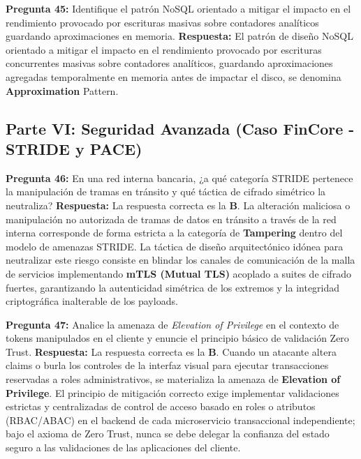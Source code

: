 \vspace{4mm}

\noindent\textbf{Pregunta 45:} Identifique el patrón NoSQL orientado a mitigar el impacto en el rendimiento provocado por escrituras masivas sobre contadores analíticos guardando aproximaciones en memoria.
\newline
\textbf{Respuesta:} El patrón de diseño NoSQL orientado a mitigar el impacto en el rendimiento provocado por escrituras concurrentes masivas sobre contadores analíticos, guardando aproximaciones agregadas temporalmente en memoria antes de impactar el disco, se denomina \textbf{Approximation} Pattern.

\subsection*{Parte VI: Seguridad Avanzada (Caso FinCore - STRIDE y PACE)}

\noindent\textbf{Pregunta 46:} En una red interna bancaria, ¿a qué categoría STRIDE pertenece la manipulación de tramas en tránsito y qué táctica de cifrado simétrico la neutraliza?
\newline
\textbf{Respuesta:} La respuesta correcta es la \textbf{B}. La alteración maliciosa o manipulación no autorizada de tramas de datos en tránsito a través de la red interna corresponde de forma estricta a la categoría de \textbf{Tampering} dentro del modelo de amenazas STRIDE. La táctica de diseño arquitectónico idónea para neutralizar este riesgo consiste en blindar los canales de comunicación de la malla de servicios implementando \textbf{mTLS (Mutual TLS)} acoplado a suites de cifrado fuertes, garantizando la autenticidad simétrica de los extremos y la integridad criptográfica inalterable de los payloads.

\vspace{4mm}

\noindent\textbf{Pregunta 47:} Analice la amenaza de \textit{Elevation of Privilege} en el contexto de tokens manipulados en el cliente y enuncie el principio básico de validación Zero Trust.
\newline
\textbf{Respuesta:} La respuesta correcta es la \textbf{B}. Cuando un atacante altera claims o burla los controles de la interfaz visual para ejecutar transacciones reservadas a roles administrativos, se materializa la amenaza de \textbf{Elevation of Privilege}. El principio de mitigación correcto exige implementar validaciones estrictas y centralizadas de control de acceso basado en roles o atributos (RBAC/ABAC) en el backend de cada microservicio transaccional independiente; bajo el axioma de Zero Trust, nunca se debe delegar la confianza del estado seguro a las validaciones de las aplicaciones del cliente.


